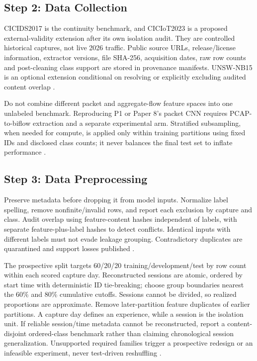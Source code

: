 \documentclass[10pt,a4paper]{article}
\begin{document}
\subsection{Step 2: Data Collection}
CICIDS2017 is the continuity benchmark, and CICIoT2023 is a proposed external-validity extension after its own isolation audit. They are controlled historical captures, not live 2026 traffic. Public source URLs, release/license information, extractor versions, file SHA-256, acquisition dates, raw row counts and post-cleaning class support are stored in provenance manifests. UNSW-NB15 is an optional extension conditional on resolving or explicitly excluding audited content overlap \cite{cic2017,ciciot,repo}.

Do not combine different packet and aggregate-flow feature spaces into one unlabeled benchmark. Reproducing P1 or Paper 8's packet CNN requires PCAP-to-biflow extraction and a separate experimental arm. Stratified subsampling, when needed for compute, is applied only within training partitions using fixed IDs and disclosed class counts; it never balances the final test set to inflate performance \cite{carillo,cerasuolo,repo}.

\subsection{Step 3: Data Preprocessing}
Preserve metadata before dropping it from model inputs. Normalize label spelling, remove nonfinite/invalid rows, and report each exclusion by capture and class. Audit overlap using feature-content hashes independent of labels, with separate feature-plus-label hashes to detect conflicts. Identical inputs with different labels must not evade leakage grouping. Contradictory duplicates are quarantined and support losses published \cite{repo}.

The prospective split targets 60/20/20 training/development/test by row count within each scored capture day. Reconstructed sessions are atomic, ordered by start time with deterministic ID tie-breaking; choose group boundaries nearest the 60\% and 80\% cumulative cutoffs. Sessions cannot be divided, so realized proportions are approximate. Remove later-partition feature duplicates of earlier partitions. A capture day defines an experience, while a session is the isolation unit. If reliable session/time metadata cannot be reconstructed, report a content-disjoint ordered-class benchmark rather than claiming chronological session generalization. Unsupported required families trigger a prospective redesign or an infeasible experiment, never test-driven reshuffling \cite{cic2017,repo}.
\end{document}
